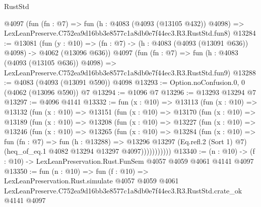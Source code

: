 \begin{lexlean}{RustStd}
\begin{coremodule}
    @4097
    (fun (fn : @7) =>
    fun (h : @4083 (@4093 (@13105 @432)) @4098) =>
    LexLeanPreserve.C752ea9d16bb3e8577c1a8db0e7f44ec3.R3.RustStd.fun8)
@13284 := @13081
    (fun (y : @10) => (fn : @7) -> (h : @4083 (@4093 (@13091 @636)) @4098) -> @4062 (@13096 @636))
    @4097
    (fun (fn : @7) =>
    fun (h : @4083 (@4093 (@13105 @636)) @4098) =>
    LexLeanPreserve.C752ea9d16bb3e8577c1a8db0e7f44ec3.R3.RustStd.fun9)
@13288 := @4083 (@4093 (@13091 @590)) @4098
@13293 := Option.noConfusion.{0, 0} (@4062 (@13096 @590)) @7
@13294 := @1096 @7
@13296 := @13293 @13294 @7
@13297 := @4096 @4141
@13332 := fun (x : @10) =>
  @13113
    (fun (x : @10) =>
    @13132
      (fun (x : @10) =>
      @13151
        (fun (x : @10) =>
        @13170
          (fun (x : @10) =>
          @13189
            (fun (x : @10) =>
            @13208
              (fun (x : @10) =>
              @13227
                (fun (x : @10) =>
                @13246
                  (fun (x : @10) =>
                  @13265
                    (fun (x : @10) =>
                    @13284
                      (fun (x : @10) =>
                      fun (fn : @7) =>
                      fun (h : @13288) =>
                      @13296
                        @13297
                        (Eq.refl.{2} (Sort 1) @7)
                        (heq_of_eq.{1} @4082 @13294 @13297 @4097)))))))))))
@13340 := (n : @10) -> (f : @10) -> LexLeanPreservation.Rust.FunSem @4057 @4059 @4061 @4141 @4097
@13350 := fun (n : @10) =>
  fun (f : @10) =>
  LexLeanPreservation.Rust.simulate
    @4057
    @4059
    @4061
    LexLeanPreserve.C752ea9d16bb3e8577c1a8db0e7f44ec3.R3.RustStd.crate_ok
    @4141
    @4097
\end{coremodule}
\end{lexlean}
